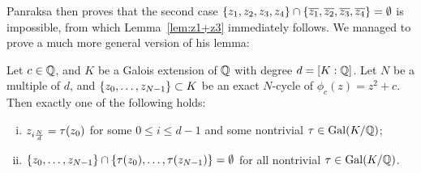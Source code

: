 Panraksa then proves that the second case $\{z_1, z_2, z_3, z_4\} \cap
\{\overline{z_1}, \overline{z_2}, \overline{z_3}, \overline{z_4}\} = \emptyset$ is impossible, from
which Lemma~\ref{lem:z1+z3} immediately follows. We managed to prove a
much more general version of his lemma:

\newcommand{\nd}{\frac{N}{d}}

\begin{theorem}
  Let $c \in \mathbb{Q}$, and $K$ be a Galois extension of $\mathbb{Q}$ with degree $d
  = [K : \mathbb{Q}]$. Let $N$ be a multiple of $d$, and $\left\{z_0, \dots,
    z_{N-1}\right\} \subset K$ be an exact $N$-cycle of $\phi_c(z) = z^2 +
  c$. Then exactly one of the following holds:
  \begin{enumerate}[(i)]
  \item $z_{i\nd} = \t(z_0)$ for some $0 \le i \le d-1$ and some
    nontrivial $\tau \in \mathrm{Gal}(K/\mathbb{Q})$;

  \item $\left\{z_0, \dots, z_{N-1}\right\} \cap \left\{\tau(z_0), \dots, \tau(z_{N-1})\right\} =
    \emptyset$ for all nontrivial $\tau \in \mathrm{Gal}(K/\mathbb{Q})$.
  \end{enumerate}
\end{theorem}

